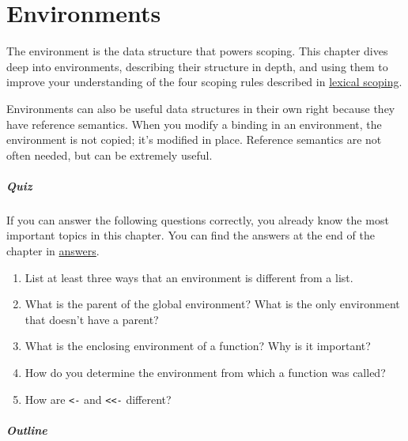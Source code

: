 \chapter{Environments}\label{environments}

The environment is the data structure that powers scoping. This chapter
dives deep into environments, describing their structure in depth, and
using them to improve your understanding of the four scoping rules
described in \hyperref[lexical-scoping]{lexical scoping}.

Environments can also be useful data structures in their own right
because they have reference semantics. When you modify a binding in an
environment, the environment is not copied; it's modified in place.
Reference semantics are not often needed, but can be extremely useful.

\paragraph{Quiz}

If you can answer the following questions correctly, you already know
the most important topics in this chapter. You can find the answers at
the end of the chapter in \hyperref[env-answers]{answers}.

\begin{enumerate}
\def\labelenumi{\arabic{enumi}.}
\item
  List at least three ways that an environment is different from a list.
\item
  What is the parent of the global environment? What is the only
  environment that doesn't have a parent?
\item
  What is the enclosing environment of a function? Why is it important?
\item
  How do you determine the environment from which a function was called?
\item
  How are \texttt{\textless{}-} and \texttt{\textless{}\textless{}-}
  different?
\end{enumerate}

\paragraph{Outline}

